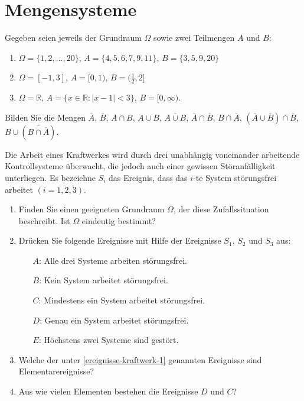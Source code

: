
\section{Mengensysteme}

Gegeben seien jeweils der Grundraum $\Omega$ sowie zwei Teilmengen
$A$ und $B$:
\begin{enumerate}
\item $\Omega=\{1,2,...,20\}$, $A=\{4,5,6,7,9,11\}$, $B=\{3,5,9,20\}$
\item $\Omega=[-1,3]$, $A=[0,1)$, $B=(\frac{1}{2},2]$
\item $\Omega=\mathbb R$, $A=\{x\in \mathbb R: |x-1|<3\}$, $B=[0,\infty)$.
\end{enumerate}
Bilden Sie die Mengen $\overline{A}$, $\overline{B}$, $A\cap B$, $A\cup B$,
$\overline{ A\cup B}$, $\overline{A}\cap\overline{B}$, $B\cap\overline{A}$,
$(\overline{A}\cup\overline{B})\cap\overline{B}$,
$B\cup(\overline{B\cap\overline{A}})$.


Die Arbeit eines Kraftwerkes wird durch drei unabhängig voneinander arbeitende
Kontrollsysteme überwacht, die jedoch auch einer gewissen Störanfälligkeit
unterliegen. Es bezeichne $S_i$ das Ereignis, dass das $i$-te System
störungsfrei arbeitet $(i=1,2,3)$.
\begin{enumerate}
    \item Finden Sie einen geeigneten Grundraum $\Omega$, der diese
        Zufallssituation beschreibt. Ist $\Omega$ eindeutig bestimmt?
    \item Drücken Sie folgende Ereignisse mit Hilfe der Ereignisse $S_1$, $S_2$
        und $S_3$ aus:
        \begin{itemize}
            \item[$A$:] Alle drei Systeme arbeiten störungsfrei.
            \item[$B$:] Kein System arbeitet störungsfrei.
            \item[$C$:] Mindestens ein System arbeitet störungsfrei.
            \item[$D$:] Genau ein System arbeitet störungsfrei.
            \item[$E$:] Höchstens zwei Systeme sind gestört.
        \end{itemize}\label{ereignisse-kraftwerk-1}
    \item Welche der unter \ref{ereignisse-kraftwerk-1} genannten Ereignisse
        sind Elementarereignisse?
    \item Aus wie vielen Elementen bestehen die Ereignisse $D$ und $C$?
\end{enumerate}

